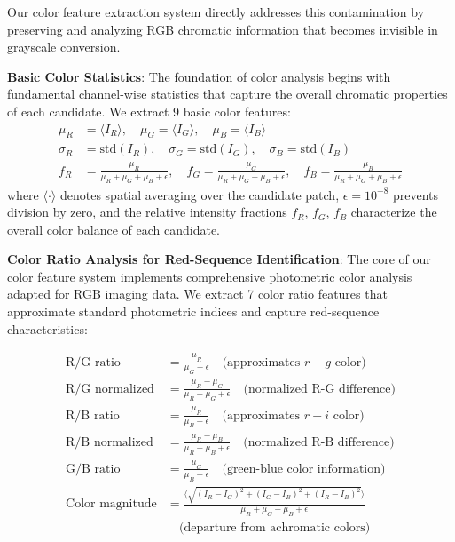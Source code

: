 \documentclass[twocolumn,10pt]{aastex631}
\begin{document}
Our color feature extraction system directly addresses this contamination by preserving and analyzing RGB chromatic information that becomes invisible in grayscale conversion.

\textbf{Basic Color Statistics}: The foundation of color analysis begins with fundamental channel-wise statistics that capture the overall chromatic properties of each candidate. We extract 9 basic color features:
\begin{align}
\mu_R &= \langle I_R \rangle, \quad \mu_G = \langle I_G \rangle, \quad \mu_B = \langle I_B \rangle \\
\sigma_R &= \text{std}(I_R), \quad \sigma_G = \text{std}(I_G), \quad \sigma_B = \text{std}(I_B) \\
f_R &= \frac{\mu_R}{\mu_R + \mu_G + \mu_B + \epsilon}, \quad f_G = \frac{\mu_G}{\mu_R + \mu_G + \mu_B + \epsilon}, \quad f_B = \frac{\mu_B}{\mu_R + \mu_G + \mu_B + \epsilon}
\end{align}
where $\langle \cdot \rangle$ denotes spatial averaging over the candidate patch, $\epsilon = 10^{-8}$ prevents division by zero, and the relative intensity fractions $f_R$, $f_G$, $f_B$ characterize the overall color balance of each candidate.

\textbf{Color Ratio Analysis for Red-Sequence Identification}: The core of our color feature system implements comprehensive photometric color analysis adapted for RGB imaging data. We extract 7 color ratio features that approximate standard photometric indices and capture red-sequence characteristics:

\begin{align}
\text{R/G ratio} &= \frac{\mu_R}{\mu_G + \epsilon} \quad \text{(approximates } r-g \text{ color)} \\
\text{R/G normalized} &= \frac{\mu_R - \mu_G}{\mu_R + \mu_G + \epsilon} \quad \text{(normalized R-G difference)} \\
\text{R/B ratio} &= \frac{\mu_R}{\mu_B + \epsilon} \quad \text{(approximates } r-i \text{ color)} \\
\text{R/B normalized} &= \frac{\mu_R - \mu_B}{\mu_R + \mu_B + \epsilon} \quad \text{(normalized R-B difference)} \\
\text{G/B ratio} &= \frac{\mu_G}{\mu_B + \epsilon} \quad \text{(green-blue color information)} \\
\text{Color magnitude} &= \frac{\langle\sqrt{(I_R-I_G)^2 + (I_G-I_B)^2 + (I_R-I_B)^2}\rangle}{\mu_R + \mu_G + \mu_B + \epsilon} \nonumber \\
&\quad \text{(departure from achromatic colors)}
\end{align}
\end{document}
